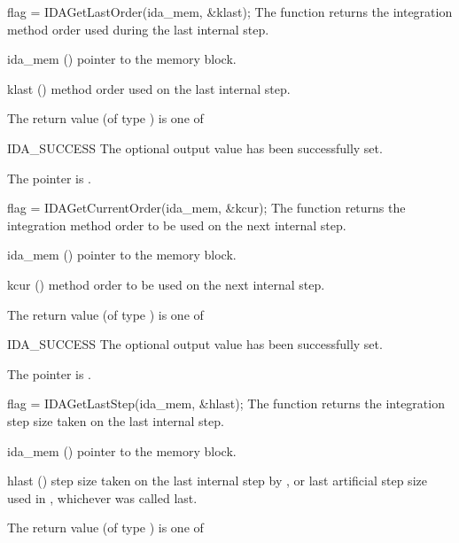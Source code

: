 {{}
{}
{
  flag = IDAGetLastOrder(ida\_mem, \&klast);
}
{
  The function  returns the
  integration method order used during the last internal step.
}
{
  \begin{args}
  \item[ida\_mem] ()
    pointer to the {\ida} memory block.
  \item[klast] ()
    method order used on the last internal step.
  \end{args}
}
{
  The return value  (of type ) is one of
  \begin{args}
  \item[IDA\_SUCCESS] 
    The optional output value has been successfully set.
  \item[\Id{IDA\_MEM\_NULL}]
    The  pointer is .
  \end{args}
}
{}
{
  flag = IDAGetCurrentOrder(ida\_mem, \&kcur);
}
{
  The function  returns the
  integration method order to be used on the next internal step.
}
{
  \begin{args}
  \item[ida\_mem] ()
    pointer to the {\ida} memory block.
  \item[kcur] ()
    method order to be used on the next internal step.
  \end{args}
}
{
  The return value  (of type ) is one of
  \begin{args}
  \item[IDA\_SUCCESS] 
    The optional output value has been successfully set.
  \item[\Id{IDA\_MEM\_NULL}]
    The  pointer is .
  \end{args}
}
{}
{
  flag = IDAGetLastStep(ida\_mem, \&hlast);
}
{
  The function  returns the
  integration step size taken on the last internal step.
}
{
  \begin{args}
  \item[ida\_mem] ()
    pointer to the {\ida} memory block.
  \item[hlast] ()
    step size taken on the last internal step by {\ida}, or last artificial
    step size used in , whichever was called last.
  \end{args}
}
{
  The return value  (of type ) is one of
}}
